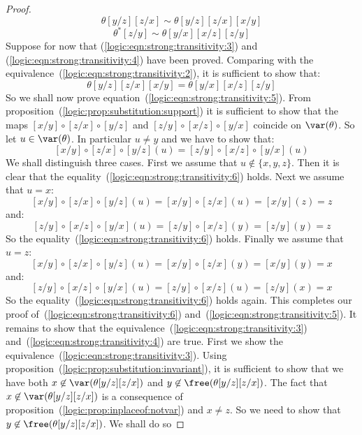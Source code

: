 \begin{proof}
\begin{equation}
    \theta[y/z][z/x]\sim\theta[y/z][z/x][x/y]
    \end{equation}
    \begin{equation}\label{logic:eqn:strong:transitivity:4}
    \theta^{*}[z/y]\sim\theta[y/x][x/z][z/y]
    \end{equation}
Suppose for now that (\ref{logic:eqn:strong:transitivity:3}) and
(\ref{logic:eqn:strong:transitivity:4}) have been proved. Comparing
with the equivalence~(\ref{logic:eqn:strong:transitivity:2}), it is
sufficient to show that:
    \begin{equation}\label{logic:eqn:strong:transitivity:5}
    \theta[y/z][z/x][x/y]=\theta[y/x][x/z][z/y]
    \end{equation}
So we shall now prove
equation~(\ref{logic:eqn:strong:transitivity:5}). From
proposition~(\ref{logic:prop:substitution:support}) it is sufficient
to show that the maps $[x/y]\circ[z/x]\circ[y/z]$ and
$[z/y]\circ[x/z]\circ[y/x]$ coincide on $\var(\theta)$. So let
$u\in\var(\theta)$. In particular $u\neq y$ and we have to show
that:
    \begin{equation}\label{logic:eqn:strong:transitivity:6}
    [x/y]\circ[z/x]\circ[y/z](u)=[z/y]\circ[x/z]\circ[y/x](u)
    \end{equation}
We shall distinguish three cases. First we assume that
$u\not\in\{x,y,z\}$. Then it is clear that the
equality~(\ref{logic:eqn:strong:transitivity:6}) holds. Next we
assume that $u=x$:
    \[
    [x/y]\circ[z/x]\circ[y/z](u)=[x/y]\circ[z/x](u)=[x/y](z)=z
    \]
and:
    \[
    [z/y]\circ[x/z]\circ[y/x](u) = [z/y]\circ[x/z](y)=[z/y](y)=z
    \]
So the equality~(\ref{logic:eqn:strong:transitivity:6}) holds.
Finally we assume that $u=z$:
    \[
    [x/y]\circ[z/x]\circ[y/z](u)=[x/y]\circ[z/x](y)=[x/y](y)=x
    \]
and:
    \[
    [z/y]\circ[x/z]\circ[y/x](u) = [z/y]\circ[x/z](u)=[z/y](x)=x
    \]
So the equality~(\ref{logic:eqn:strong:transitivity:6}) holds again.
This completes our proof of~(\ref{logic:eqn:strong:transitivity:6})
and~(\ref{logic:eqn:strong:transitivity:5}). It remains to show that
the equivalence~(\ref{logic:eqn:strong:transitivity:3})
and~(\ref{logic:eqn:strong:transitivity:4}) are true. First we show
the equivalence~(\ref{logic:eqn:strong:transitivity:3}). Using
proposition~(\ref{logic:prop:substitution:invariant}), it is
sufficient to show that we have both
$x\not\in\var(\theta[y/z][z/x])$ and
$y\not\in\free(\theta[y/z][z/x])$. The fact that
$x\not\in\var(\theta[y/z][z/x])$ is a consequence of
proposition~(\ref{logic:prop:inplaceof:notvar}) and $x\neq z$. So we
need to show that $y\not\in\free(\theta[y/z][z/x])$. We shall do so

\end{proof}
